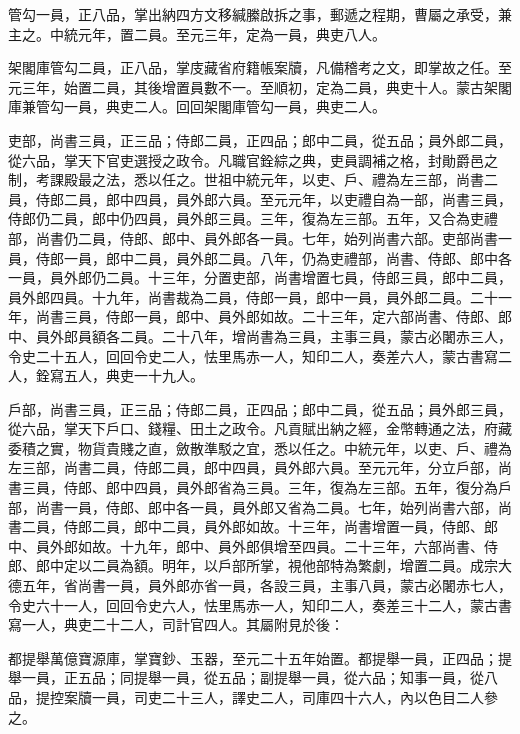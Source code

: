 \begin{pinyinscope}
 管勾一員，正八品，掌出納四方文移緘縢啟拆之事，郵遞之程期，曹屬之承受，兼主之。中統元年，置二員。至元三年，定為一員，典吏八人。



 架閣庫管勾二員，正八品，掌庋藏省府籍帳案牘，凡備稽考之文，即掌故之任。至元三年，始置二員，其後增置員數不一。至順初，定為二員，典吏十人。蒙古架閣庫兼管勾一員，典吏二人。回回架閣庫管勾一員，典吏二人。



 吏部，尚書三員，正三品；侍郎二員，正四品；郎中二員，從五品；員外郎二員，從六品，掌天下官吏選授之政令。凡職官銓綜之典，吏員調補之格，封勛爵邑之制，考課殿最之法，悉以任之。世祖中統元年，以吏、戶、禮為左三部，尚書二員，侍郎二員，郎中四員，員外郎六員。至元元年，以吏禮自為一部，尚書三員，侍郎仍二員，郎中仍四員，員外郎三員。三年，復為左三部。五年，又合為吏禮部，尚書仍二員，侍郎、郎中、員外郎各一員。七年，始列尚書六部。吏部尚書一員，侍郎一員，郎中二員，員外郎二員。八年，仍為吏禮部，尚書、侍郎、郎中各一員，員外郎仍二員。十三年，分置吏部，尚書增置七員，侍郎三員，郎中二員，員外郎四員。十九年，尚書裁為二員，侍郎一員，郎中一員，員外郎二員。二十一年，尚書三員，侍郎一員，郎中、員外郎如故。二十三年，定六部尚書、侍郎、郎中、員外郎員額各二員。二十八年，增尚書為三員，主事三員，蒙古必闍赤三人，令史二十五人，回回令史二人，怯里馬赤一人，知印二人，奏差六人，蒙古書寫二人，銓寫五人，典吏一十九人。



 戶部，尚書三員，正三品；侍郎二員，正四品；郎中二員，從五品；員外郎三員，從六品，掌天下戶口、錢糧、田土之政令。凡貢賦出納之經，金幣轉通之法，府藏委積之實，物貨貴賤之直，斂散準駁之宜，悉以任之。中統元年，以吏、戶、禮為左三部，尚書二員，侍郎二員，郎中四員，員外郎六員。至元元年，分立戶部，尚書三員，侍郎、郎中四員，員外郎省為三員。三年，復為左三部。五年，復分為戶部，尚書一員，侍郎、郎中各一員，員外郎又省為二員。七年，始列尚書六部，尚書二員，侍郎二員，郎中二員，員外郎如故。十三年，尚書增置一員，侍郎、郎中、員外郎如故。十九年，郎中、員外郎俱增至四員。二十三年，六部尚書、侍郎、郎中定以二員為額。明年，以戶部所掌，視他部特為繁劇，增置二員。成宗大德五年，省尚書一員，員外郎亦省一員，各設三員，主事八員，蒙古必闍赤七人，令史六十一人，回回令史六人，怯里馬赤一人，知印二人，奏差三十二人，蒙古書寫一人，典吏二十二人，司計官四人。其屬附見於後：



 都提舉萬億寶源庫，掌寶鈔、玉器，至元二十五年始置。都提舉一員，正四品；提舉一員，正五品；同提舉一員，從五品；副提舉一員，從六品；知事一員，從八品，提控案牘一員，司吏二十三人，譯史二人，司庫四十六人，內以色目二人參之。




\end{pinyinscope}
